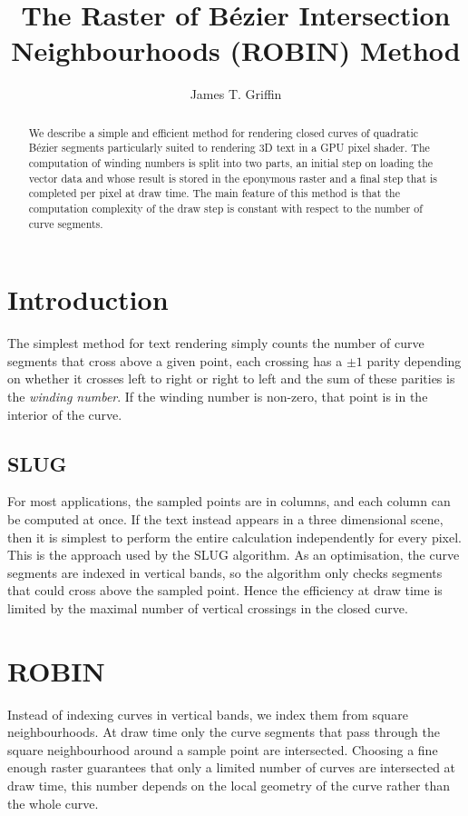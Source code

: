 \documentclass{article}
\title{The Raster of B\'ezier Intersection Neighbourhoods (ROBIN) Method}
\author{James T. Griffin}
\begin{document}
\maketitle

\begin{abstract}
We describe a simple and efficient method for rendering closed curves of quadratic B\'ezier segments particularly suited to rendering 3D text in a GPU pixel shader.
The computation of winding numbers is split into two parts, an initial step on loading the vector data and whose result is stored in the eponymous raster and a final step that is completed per pixel at draw time.
The main feature of this method is that the computation complexity of the draw step is constant with respect to the number of curve segments.
\end{abstract}

\section{Introduction}

The simplest method for text rendering simply counts the number of curve segments that cross above a given point, each crossing has a $\pm1$ parity depending on whether it crosses left to right or right to left and the sum of these parities is the \emph{winding number}.
If the winding number is non-zero, that point is in the interior of the curve.  

\subsection{SLUG}
For most applications, the sampled points are in columns, and each column can be computed at once.
If the text instead appears in a three dimensional scene, then it is simplest to perform the entire calculation independently for every pixel.  
This is the approach used by the SLUG algorithm.  As an optimisation, the curve segments are indexed in vertical bands, so the algorithm only checks segments that could cross above the sampled point.  Hence the efficiency at draw time is limited by the maximal number of vertical crossings in the closed curve.

\section{ROBIN}
Instead of indexing curves in vertical bands, we index them from square neighbourhoods.
At draw time only the curve segments that pass through the square neighbourhood around a sample point are intersected.
Choosing a fine enough raster guarantees that only a limited number of curves are intersected at draw time, this number depends on the local geometry of the curve rather than the whole curve.
\end{document}
